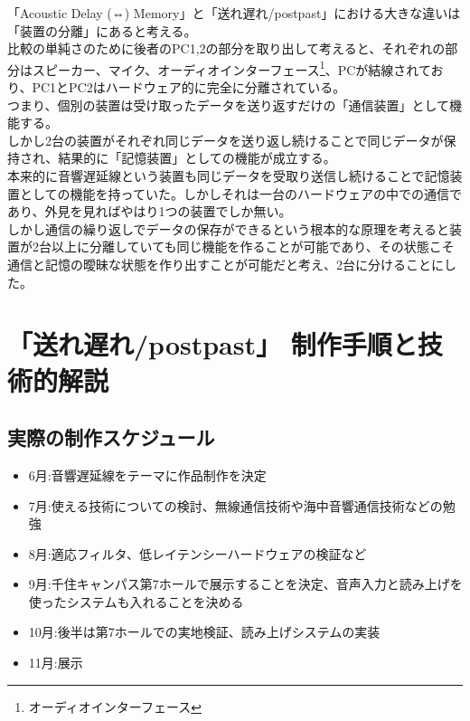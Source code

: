 \documentclass[a4paper,report]{jsbook}
\begin{document}
「Acoustic Delay (⇔)
Memory」と「送れ\textbar{}遅れ/post\textbar{}past」における大きな違いは「装置の分離」にあると考える。\\
比較の単純さのために後者のPC1,2の部分を取り出して考えると、それぞれの部分はスピーカー、マイク、オーディオインターフェース\footnote{オーディオインターフェース}、PCが結線されており、PC1とPC2はハードウェア的に完全に分離されている。\\
つまり、個別の装置は受け取ったデータを送り返すだけの「通信装置」として機能する。\\
しかし2台の装置がそれぞれ同じデータを送り返し続けることで同じデータが保持され、結果的に「記憶装置」としての機能が成立する。\\
本来的に音響遅延線という装置も同じデータを受取り送信し続けることで記憶装置としての機能を持っていた。しかしそれは一台のハードウェアの中での通信であり、外見を見ればやはり1つの装置でしか無い。\\
しかし通信の繰り返しでデータの保存ができるという根本的な原理を考えると装置が2台以上に分離していても同じ機能を作ることが可能であり、その状態こそ通信と記憶の曖昧な状態を作り出すことが可能だと考え、2台に分けることにした。

\chapter{「送れ\textbar{}遅れ/post\textbar{}past」
制作手順と技術的解説}\label{ux9001ux308cux9045ux308cpostpast-ux5236ux4f5cux624bux9806ux3068ux6280ux8853ux7684ux89e3ux8aac}

\section{実際の制作スケジュール}\label{ux5b9fux969bux306eux5236ux4f5cux30b9ux30b1ux30b8ux30e5ux30fcux30eb}

\begin{itemize}
\tightlist
\item
  6月:音響遅延線をテーマに作品制作を決定
\item
  7月:使える技術についての検討、無線通信技術や海中音響通信技術などの勉強
\item
  8月:適応フィルタ、低レイテンシーハードウェアの検証など
\item
  9月:千住キャンパス第7ホールで展示することを決定、音声入力と読み上げを使ったシステムも入れることを決める
\item
  10月:後半は第7ホールでの実地検証、読み上げシステムの実装
\item
  11月:展示
\end{itemize}
\end{document}
